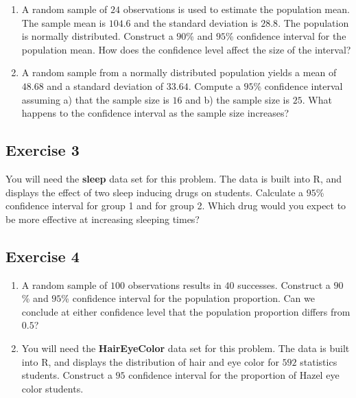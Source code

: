 \documentclass[
  letterpaper,
  DIV=11,
  numbers=noendperiod]{scrreprt}
\begin{document}
\begin{enumerate}
\def\labelenumi{\arabic{enumi}.}
\item
  A random sample of \(24\) observations is used to estimate the
  population mean. The sample mean is \(104.6\) and the standard
  deviation is \(28.8\). The population is normally distributed.
  Construct a \(90\)\% and \(95\)\% confidence interval for the
  population mean. How does the confidence level affect the size of the
  interval?
\item
  A random sample from a normally distributed population yields a mean
  of \(48.68\) and a standard deviation of \(33.64\). Compute a \(95\)\%
  confidence interval assuming a) that the sample size is \(16\) and b)
  the sample size is \(25\). What happens to the confidence interval as
  the sample size increases?
\end{enumerate}

\hypertarget{exercise-3-22}{%
\subsection*{Exercise 3}\label{exercise-3-22}}

You will need the \textbf{sleep} data set for this problem. The data is
built into R, and displays the effect of two sleep inducing drugs on
students. Calculate a \(95\)\% confidence interval for group 1 and for
group 2. Which drug would you expect to be more effective at increasing
sleeping times?

\hypertarget{exercise-4-10}{%
\subsection*{Exercise 4}\label{exercise-4-10}}

\begin{enumerate}
\def\labelenumi{\arabic{enumi}.}
\item
  A random sample of \(100\) observations results in \(40\) successes.
  Construct a \(90\)\% and \(95\)\% confidence interval for the
  population proportion. Can we conclude at either confidence level that
  the population proportion differs from \(0.5\)?
\item
  You will need the \textbf{HairEyeColor} data set for this problem. The
  data is built into R, and displays the distribution of hair and eye
  color for \(592\) statistics students. Construct a \(95\) confidence
  interval for the proportion of Hazel eye color students.
\end{enumerate}
\end{document}
